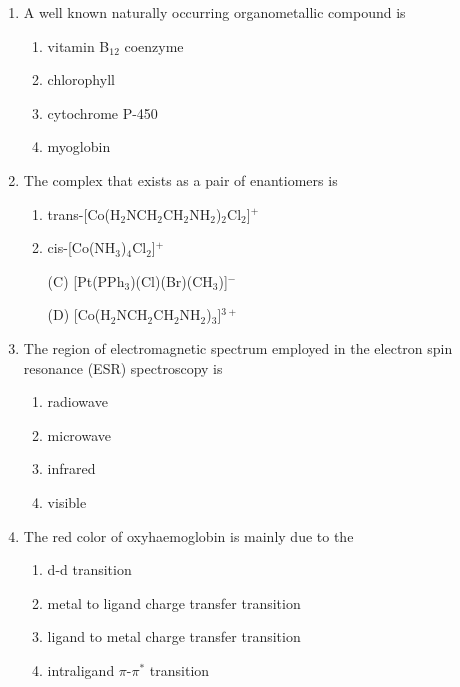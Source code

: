 \documentclass[journal,12pt,onecolumn]{IEEEtran}
\theoremstyle{remark}
\begin{document}
\begin{enumerate}
\item    A well known naturally occurring organometallic compound is \hfill{}
 

\begin{multicols}{2}
\begin{enumerate}[label=(\Alph*), leftmargin=*]
\item vitamin B$_{12}$ coenzyme  
\item chlorophyll  
\item cytochrome P-450  
\item myoglobin  
\end{enumerate}
\end{multicols}
 

\item    The complex that exists as a pair of enantiomers is \hfill{}
 

\begin{multicols}{2}
\begin{enumerate}[label=(\Alph*), leftmargin=*]
\item trans-[Co(H$_2$NCH$_2$CH$_2$NH$_2$)$_2$Cl$_2$]$^+$  
\item cis-[Co(NH$_3$)$_4$Cl$_2$]$^+$  
\item[(C)] [Pt(PPh$_3$)(Cl)(Br)(CH$_3$)]$^-$  
\item[(D)] [Co(H$_2$NCH$_2$CH$_2$NH$_2$)$_3$]$^{3+}$  
\end{enumerate}
\end{multicols}
 

\item    The region of electromagnetic spectrum employed in the electron spin resonance (ESR) spectroscopy is \hfill{}
 

\begin{multicols}{2}
\begin{enumerate}[label=(\Alph*), leftmargin=*]
\item radiowave  
\item microwave  
\item infrared  
\item visible  
\end{enumerate}
\end{multicols}
 

\item    The red color of oxyhaemoglobin is mainly due to the \hfill{}
 

\begin{multicols}{2}
\begin{enumerate}[label=(\Alph*), leftmargin=*]
\item d-d transition  
\item metal to ligand charge transfer transition  
\item ligand to metal charge transfer transition  
\item intraligand $\pi$-$\pi^*$ transition  
\end{enumerate}
\end{multicols}
 


\end{enumerate}
\end{document}
